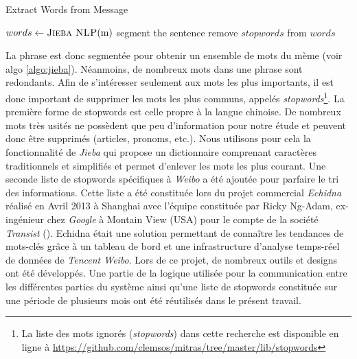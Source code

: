     \begin{algorithm}[htpb]
        \caption{Extract Words from Message}
        \label{algo:jieba}
        \begin{algorithmic}

                \State $words \gets \Call{Jieba NLP}{$m$}$ segment the sentence
                \State remove $stopwords$ from $words$                

        \end{algorithmic}
    \end{algorithm}

    La phrase est donc segmentée pour obtenir un ensemble de mots du mème (voir algo \ref{algo:jieba}). Néanmoins, de nombreux mots dans une phrase sont redondants. Afin de s'intéresser seulement aux mots les plus importants, il est donc important de  supprimer les mots les plus communs, appelés \textit{stopwords}\footnote{La liste des mots ignorés (\textit{stopwords}) dans cette recherche est disponible en ligne à \url{https://github.com/clemsos/mitras/tree/master/lib/stopwords}}. La première forme de stopwords est celle propre à la langue chinoise. De nombreux mots très usités ne possèdent que peu d'information pour notre étude et peuvent donc être supprimés (articles, pronoms, etc.). Nous utilisons pour cela la fonctionnalité de \textit{Jieba} qui propose un dictionnaire comprenant caractères traditionnels et simplifiés et permet d'enlever les mots les plus courant. Une seconde liste de stopwords spécifiques à \textit{Weibo} a été ajoutée pour parfaire le tri des informations. Cette liste a été constituée lors du projet commercial \textit{Echidna} réalisé en Avril 2013 à Shanghai avec l'équipe constituée par Ricky Ng-Adam, ex-ingénieur chez \textit{Google} à Montain View (USA) pour le compte de la société \textit{Transist} (). Echidna était une solution permettant de connaître les tendances de mots-clés grâce à un tableau de bord et une infrastructure d'analyse temps-réel de données de \textit{Tencent Weibo}. Lors de ce projet, de nombreux outils et designs ont été développés. Une partie de la logique utilisée pour la communication entre les différentes parties du système ainsi qu'une liste de stopwords constituée sur une période de plusieurs mois ont été réutilisés dans le présent travail.
    
